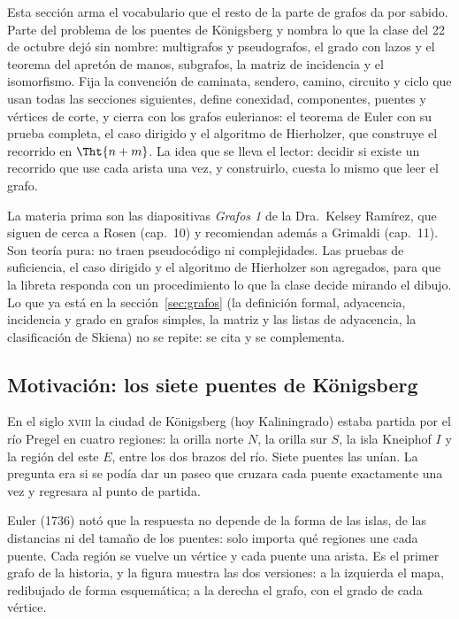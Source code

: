 \documentclass[11pt,letterpaper]{article}
\begin{document}
\begin{quick_sum}
  Esta sección arma el vocabulario que el resto de la parte de grafos
  da por sabido. Parte del problema de los puentes de Königsberg y
  nombra lo que la clase del 22 de octubre dejó sin nombre:
  multigrafos y pseudografos, el grado con lazos y el teorema del
  apretón de manos, subgrafos, la matriz de incidencia y el
  isomorfismo. Fija la convención de caminata, sendero, camino,
  circuito y ciclo que usan todas las secciones siguientes, define
  conexidad, componentes, puentes y vértices de corte, y cierra con
  los grafos eulerianos: el teorema de Euler con su prueba completa,
  el caso dirigido y el algoritmo de Hierholzer, que construye el
  recorrido en $\Tht{n + m}$. La idea que se lleva el lector: decidir
  si existe un recorrido que use cada arista una vez, y construirlo,
  cuesta lo mismo que leer el grafo.
\end{quick_sum}

La materia prima son las diapositivas \textit{Grafos 1} de la
Dra.\ Kelsey Ramírez, que siguen de cerca a Rosen (cap.\ 10) y
recomiendan además a Grimaldi (cap.\ 11). Son teoría pura: no traen
pseudocódigo ni complejidades. Las pruebas de suficiencia, el caso
dirigido y el algoritmo de Hierholzer son agregados, para que la
libreta responda con un procedimiento lo que la clase decide mirando
el dibujo. Lo que ya está en la sección~\ref{sec:grafos} (la
definición formal, adyacencia, incidencia y grado en grafos simples,
la matriz y las listas de adyacencia, la clasificación de Skiena) no
se repite: se cita y se complementa.


\subsection*{Motivación: los siete puentes de Königsberg}

En el siglo \textsc{xviii} la ciudad de Königsberg (hoy Kaliningrado)
estaba partida por el río Pregel en cuatro regiones: la orilla norte
$N$, la orilla sur $S$, la isla Kneiphof $I$ y la región del este
$E$, entre los dos brazos del río. Siete puentes las unían. La
pregunta era si se podía dar un paseo que cruzara cada puente
exactamente una vez y regresara al punto de partida.

Euler (1736) notó que la respuesta no depende de la forma de las
islas, de las distancias ni del tamaño de los puentes: solo importa
qué regiones une cada puente. Cada región se vuelve un vértice y cada
puente una arista. Es el primer grafo de la historia, y la figura
muestra las dos versiones: a la izquierda el mapa, redibujado de forma
esquemática; a la derecha el grafo, con el grado de cada vértice.
\end{document}

